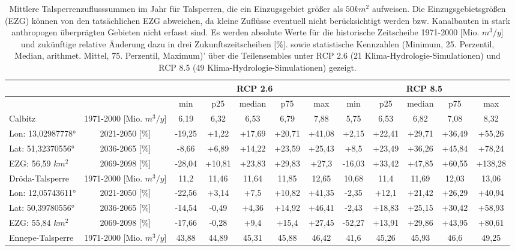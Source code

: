 \renewcommand{\arraystretch}{1.2}
\addtolength{\tabcolsep}{-5.9pt}
\scriptsize
\begin{longtable}{@{\extracolsep{\fill}}lc|ccccc||ccccc}
\caption{Mittlere Talsperrenzuflusssummen im Jahr für Talsperren, die ein Einzugsgebiet größer als $50 km^2$ aufweisen. Die Einzugsgebietsgrößen (EZG) können von den tatsächlichen EZG abweichen, da kleine Zuflüsse eventuell nicht berücksichtigt werden bzw. Kanalbauten in stark anthropogen überprägten Gebieten nicht erfasst sind. Es werden absolute Werte für die historische Zeitscheibe 1971-2000 [Mio. $m^3/y$] und zukünftige relative Änderung dazu in drei Zukunftszeitscheiben [\%]. sowie statistische Kennzahlen (Minimum, 25. Perzentil, Median, arithmet. Mittel, 75. Perzentil, Maximum)' über die Teilensembles unter RCP 2.6 (21 Klima-Hydrologie-Simulationen) und RCP 8.5 (49 Klima-Hydrologie-Simulationen) gezeigt.}\\  \hline
\multicolumn{2}{c}{} & \multicolumn{5}{c||}{RCP 2.6}  & \multicolumn{5}{c}{RCP 8.5}\\ \hline
\multicolumn{2}{c|}{} & min & p25 & median & p75 & max & min & p25 & median & p75 & max\\ 
\hline 
Calbitz & 1971-2000 [Mio. $m^3/y$]  & 6,19 & 6,32 & 6,53 & 6,79 & 7,88 & 5,75 & 6,53 & 6,82 & 7,08 & 8,32\\ 
\cline{2-12} 
Lon: 13,02987778° & 2021-2050 [\%]  & -19,25 & +1,22 & +17,69 & +20,71 & +41,08 & +2,15 & +22,41 & +29,71 & +36,49 & +55,26\\ 
Lat: 51,32370556° & 2036-2065 [\%]  & -8,66 & +6,89 & +14,22 & +23,59 & +25,43 & +8,5 & +23,49 & +36,26 & +45,84 & +78,24\\ 
EZG: 56,59 $km^2$ & 2069-2098 [\%]  & -28,04 & +10,81 & +23,83 & +29,83 & +27,3 & -16,03 & +33,42 & +47,85 & +60,55 & +138,28\\ 
\hline 
Dröda-Talsperre & 1971-2000 [Mio. $m^3/y$]  & 11,2 & 11,46 & 11,64 & 11,85 & 12,65 & 10,68 & 11,4 & 11,69 & 12,03 & 13,06\\ 
\cline{2-12} 
Lon: 12,05743611° & 2021-2050 [\%]  & -22,56 & +3,14 & +7,5 & +10,82 & +41,35 & -2,35 & +12,1 & +21,42 & +26,29 & +40,94\\ 
Lat: 50,39780556° & 2036-2065 [\%]  & -14,54 & -0,49 & +4,36 & +14,92 & +46,41 & -2,43 & +18,83 & +25,15 & +30,42 & +58,93\\ 
EZG: 55,84 $km^2$ & 2069-2098 [\%]  & -17,66 & -0,28 & +9,4 & +15,4 & +27,45 & -52,27 & +13,91 & +29,86 & +43,95 & +80,61\\ 
\hline 
Ennepe-Talsperre & 1971-2000 [Mio. $m^3/y$]  & 43,88 & 44,89 & 45,31 & 45,88 & 46,42 & 41,6 & 45,26 & 45,93 & 46,6 & 49,25\\ 

\end{longtable}
